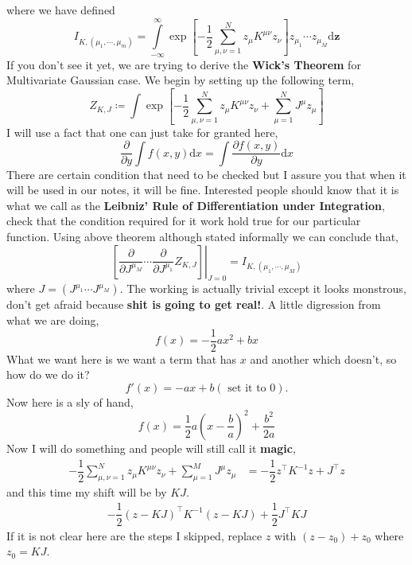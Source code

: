 \documentclass{scrartcl} %
\numberwithin{equation}{subsection}  %
\begin{document}
where we have defined
\[
	I_{K,\left(\mu_1,\cdots,\mu_m\right)} =\int\limits_{-\infty}^{\infty} 
	\exp\left[-\frac{1}{2}\sum\limits_{\mu, \nu = 1}^N z_{\mu} K^{\mu \nu}z_{\nu}\right]
	z_{\mu_1}\cdots z_{\mu_M}\mathrm{d}\textbf{z}
\]
If you don't see it yet, we are trying to derive the \textbf{Wick's Theorem} for Multivariate Gaussian case. We begin
by setting up the following term,
\[
	Z_{K, J} \coloneqq \int \exp\left[-\dfrac{1}{2}\sum\limits_{\mu,\nu = 1}^N z_{\mu}K^{\mu \nu}z_{\nu} 
	 + \sum\limits_{\mu = 1}^N J^{\mu}z_{\mu} \right]  
\]
I will use a fact that one can just take for granted here, 
\begin{equation}
	\dfrac{\partial}{\partial y} \int f(x,y) \mathrm{d}x = \int \dfrac{\partial f(x,y)}{\partial y} \mathrm{d}x
\end{equation}
There are certain condition that need to be checked but I assure you that when it will be used in our notes, it will be
fine. Interested people should know that it is what we call as the \textbf{Leibniz' Rule of Differentiation under 
Integration}, check that the condition required for it work hold true for our particular function.
Using above theorem although stated informally we can conclude that, 
\begin{equation}
	\left. \left[\dfrac{\partial}{\partial J^{\mu_M}}\cdots\dfrac{\partial}{\partial J^{\mu_1}}Z_{K,J}\right]
		\right|_{J=0} 
			= I_{K,\left(\mu_1,\cdots,\mu_M\right)}
\end{equation}
where $J = \left(J^{\mu_1}\cdots J^{\mu_M}\right)$. The working is actually trivial except it looks monstrous, don't get 
afraid because \textbf{shit is going to get real!}.
\newpage
A little digression from what we are doing,
\[
	f(x) = -\dfrac{1}{2}ax^2 + bx
\]
What we want here is we want a term that has $x$ and another which doesn't, so how do we do it?
\[
	f'(x) = -ax + b \left(\text{ set it to } 0\right).
\]
Now here is a sly of hand,
\[
	f(x) = \dfrac{1}{2}a\left(x - \dfrac{b}{a}\right)^2 + \dfrac{b^2}{2a}
\]
Now I will do something and people will still call it \textbf{magic},
\begin{align}
-\dfrac{1}{2}\sum\limits_{\mu,\nu = 1}^N z_{\mu}K^{\mu \nu}z_{\nu} 
+ \sum\limits_{\mu = 1}^M J^{\mu}z_{\mu}  & =-\dfrac{1}{2}z^\top K^{-1} z + J^\top z
\end{align}
and this time my shift will be by $KJ$.
\begin{align}
	-\dfrac{1}{2}(z - KJ)^\top K^{-1} (z - KJ) + \dfrac{1}{2}J^\top KJ 
\end{align}
If it is not clear here are the steps I skipped, replace $z$ with $\left(z - z_0\right) + z_0$ where $z_0 = KJ$.
\end{document}
